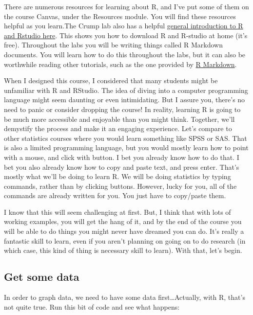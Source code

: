\documentclass[
]{book}
\begin{document}
There are numerous resources for learning about R, and I've put some of them on the course Canvas, under the Resources module. You will find these resources helpful as you learn.The Crump lab also has a helpful \href{https://crumplab.github.io/statisticsLab/software.html\#r}{general introduction to R and Rstudio here}. This shows you how to download R and R-studio at home (it's free). Throughout the labs you will be writing things called R Markdown documents. You will learn how to do this throughout the labs, but it can also be worthwhile reading other tutorials, such as the one provided by \href{https://rmarkdown.rstudio.com/lesson-1.html}{R Markdown}.

When I designed this course, I considered that many students might be
unfamiliar with R and RStudio. The idea of diving into a computer
programming language might seem daunting or even intimidating. But I
assure you, there's no need to panic or consider dropping the course! In
reality, learning R is going to be much more accessible and enjoyable
than you might think. Together, we'll demystify the process and make it
an engaging experience. Let's compare to other statistics courses where you would learn something like SPSS or SAS. That is also a limited programming language, but you would mostly learn how to point with a mouse, and click with button. I bet you already know how to do that. I bet you also already know how to copy and paste text, and press enter. That's mostly what we'll be doing to learn R. We will be doing statistics by typing commands, rather than by clicking buttons. However, lucky for you, all of the commands are already written for you. You just have to copy/paste them.

I know that this will seem challenging at first. But, I think that with lots of working examples, you will get the hang of it, and by the end of the course you will be able to do things you might never have dreamed you can do. It's really a fantastic skill to learn, even if you aren't planning on going on to do research (in which case, this kind of thing is necessary skill to learn). With that, let's begin.

\hypertarget{get-some-data}{%
\subsection{Get some data}\label{get-some-data}}

In order to graph data, we need to have some data first\ldots Actually, with R, that's not quite true. Run this bit of code and see what happens:
\end{document}
